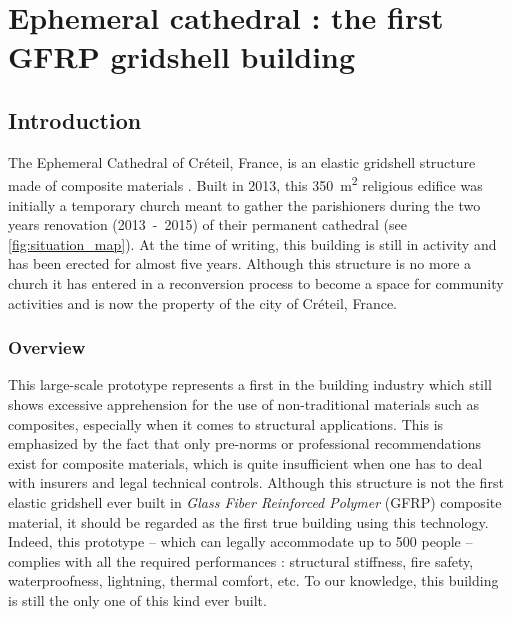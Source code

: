 \chapter{Ephemeral cathedral : the first GFRP gridshell building}

\section{Introduction}

The Ephemeral Cathedral of Créteil, France, is an elastic gridshell structure made of composite materials \cite{DuPeloux2016}. Built in 2013, this \SI{350}{m^2} religious edifice was initially a temporary church meant to gather the parishioners during the two years renovation (2013~-~2015) of their permanent cathedral (see \cref{fig:situation_map}). At the time of writing, this building is still in activity and has been erected for almost five years. Although this structure is no more a church it has entered in a reconversion process to become a space for community activities and is now the property of the city of Créteil, France.

\subsection{Overview}
This large-scale prototype represents a first in the building industry which still shows excessive apprehension for the use of non-traditional materials such as composites, especially when it comes to structural applications. This is emphasized by the fact that only pre-norms or professional recommendations exist for composite materials, which is quite insufficient when one has to deal with insurers and legal technical controls.
Although this structure is not the first elastic gridshell ever built in \emph{Glass Fiber Reinforced Polymer} (GFRP) composite material, it should be regarded as the first true building using this technology. Indeed, this prototype -- which can legally accommodate up to 500 people -- complies with all the required performances : structural stiffness, fire safety, waterproofness, lightning, thermal comfort, etc. To our knowledge, this building is still the only one of this kind ever built.

